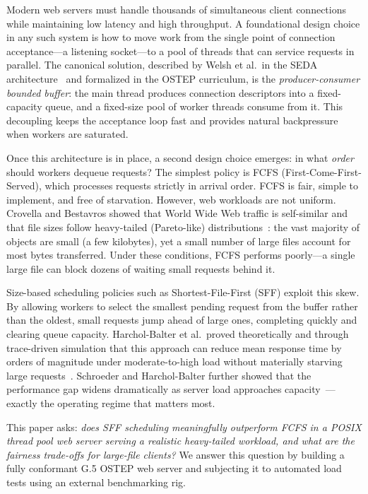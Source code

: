 \documentclass[conference]{IEEEtran}
\begin{document}
Modern web servers must handle thousands of simultaneous client connections
while maintaining low latency and high throughput. A foundational design choice
in any such system is how to move work from the single point of connection
acceptance---a listening socket---to a pool of threads that can service
requests in parallel. The canonical solution, described by Welsh et al.\ in the
SEDA architecture~\cite{welsh2001} and formalized in the OSTEP curriculum,
is the \emph{producer-consumer bounded buffer}: the main thread produces
connection descriptors into a fixed-capacity queue, and a fixed-size pool of
worker threads consume from it. This decoupling keeps the acceptance loop
fast and provides natural backpressure when workers are saturated.

Once this architecture is in place, a second design choice emerges: in what
\emph{order} should workers dequeue requests? The simplest policy is FCFS
(First-Come-First-Served), which processes requests strictly in arrival order.
FCFS is fair, simple to implement, and free of starvation. However, web
workloads are not uniform. Crovella and Bestavros showed that World Wide Web
traffic is self-similar and that file sizes follow heavy-tailed (Pareto-like)
distributions~\cite{crovella1997}: the vast majority of objects are small
(a few kilobytes), yet a small number of large files account for most bytes
transferred. Under these conditions, FCFS performs poorly---a single large
file can block dozens of waiting small requests behind it.

Size-based scheduling policies such as Shortest-File-First (SFF) exploit this
skew. By allowing workers to select the smallest pending request from the
buffer rather than the oldest, small requests jump ahead of large ones,
completing quickly and clearing queue capacity. Harchol-Balter et al.\
proved theoretically and through trace-driven simulation that this approach
can reduce mean response time by orders of magnitude under moderate-to-high
load without materially starving large requests~\cite{harchol2003}. Schroeder
and Harchol-Balter further showed that the performance gap widens dramatically
as server load approaches capacity~\cite{schroeder2006}---exactly the operating
regime that matters most.

This paper asks: \emph{does SFF scheduling meaningfully outperform FCFS in a
POSIX thread pool web server serving a realistic heavy-tailed workload, and
what are the fairness trade-offs for large-file clients?} We answer this
question by building a fully conformant G.5 OSTEP web server and subjecting it
to automated load tests using an external benchmarking rig.
\end{document}
